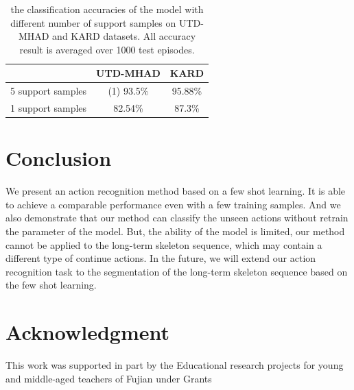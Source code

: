 \documentclass{bmvc2k}
\begin{document}
\begin{table}[htbp]
	\begin{center}
		\caption{ the classification accuracies of the model with different number of support samples on UTD-MHAD and KARD datasets. All accuracy result is averaged over 1000 test episodes. }
		
		\begin{tabular}{|c|c|c|}
			
			\hline
			& UTD-MHAD & KARD\\
			\hline
			5 support samples & (1) 93.5\% & 95.88\% \\
			\hline
			1 support samples & 82.54\%
			& 87.3\%\\
			\hline
		\end{tabular}	
	\end{center}	
	\label{tab:4}
\end{table}
\section{Conclusion}

We present an action recognition method based on a few shot learning. It is able to achieve a comparable performance even with a few training samples. And we also demonstrate that our method can classify the unseen actions without retrain the parameter of the model. But, the ability of the model is limited, our method cannot be applied to the long-term skeleton sequence, which may contain a different type of continue actions. In the future, we will extend our action recognition task to the segmentation of the long-term skeleton sequence based on the few shot learning.


\section{Acknowledgment}
This work was supported in part by the Educational research projects for young and middle-aged teachers of Fujian under Grants 


\end{document}
